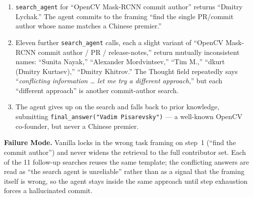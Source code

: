 \begin{tcolorbox}[colback=red!4, colframe=red!60!black, title={\textsc{Vanilla} (Pred: Vadim Pisarevsky / GT: Li Peng; 16 steps)}, fontupper=\small, breakable]
\begin{enumerate}
  \item[1-3.] \texttt{search\_agent} for ``OpenCV Mask-RCNN commit author'' returns ``Dmitry Lychak.'' The agent commits to the framing ``find the single PR/commit author whose name matches a Chinese premier.''
  \item[4-13] Eleven further \texttt{search\_agent} calls, each a slight variant of ``OpenCV Mask-RCNN commit author / PR / release-notes,'' return mutually inconsistent names: ``Sunita Nayak,'' ``Alexander Mordvintsev,'' ``Tim M.,'' ``dkurt (Dmitry Kurtaev),'' ``Dmitry Khitrov.'' The Thought field repeatedly says ``\textit{conflicting information \dots{} let me try a different approach},'' but each ``different approach'' is another commit-author search.
  \item[14-16.] The agent gives up on the search and falls back to prior knowledge, submitting \texttt{final\_answer("Vadim Pisarevsky")} --- a well-known OpenCV co-founder, but never a Chinese premier.
\end{enumerate}
\textbf{Failure Mode.} Vanilla locks in the wrong task framing on step~1 (``find the commit author'') and never widens the retrieval to the full contributor set. Each of the 11 follow-up searches reuses the same template; the conflicting answers are read as ``the search agent is unreliable'' rather than as a signal that the framing itself is wrong, so the agent stays inside the same approach until step exhaustion forces a hallucinated commit.
\end{tcolorbox}

